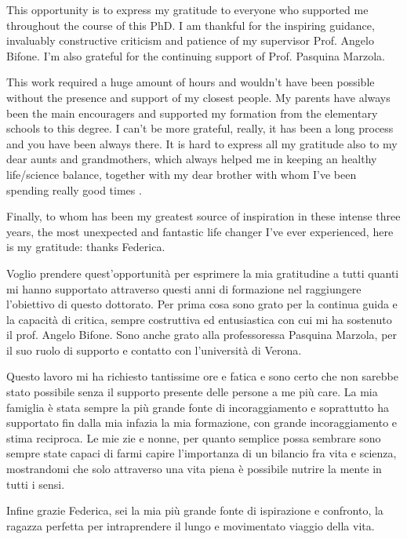 This opportunity is to express my gratitude to everyone who supported me throughout the course of this PhD.
I am thankful for the inspiring guidance, invaluably constructive criticism and patience of my supervisor Prof. Angelo Bifone.
I'm also grateful for the continuing support of Prof. Pasquina Marzola.

This work required a huge amount of hours and wouldn't have been possible without the presence and support of my closest people.
My parents have always been the main encouragers and supported my formation from the elementary schools to this degree. I can't be more grateful, really, it has been a long process and you have been always there.
It is hard to express all my gratitude also to my dear aunts and grandmothers, which always helped me in keeping an healthy life/science balance, together with my dear brother with whom I've been spending really good times .

Finally, to whom has been my greatest source of inspiration in these intense three years, the most unexpected and fantastic life changer I've ever experienced, here is my gratitude: thanks Federica.


Voglio prendere quest'opportunità per esprimere la mia gratitudine a tutti quanti mi hanno supportato attraverso questi anni di formazione nel raggiungere l'obiettivo di questo dottorato.
Per prima cosa sono grato per la continua guida e la capacità di critica, sempre costruttiva ed entusiastica con cui mi ha sostenuto il prof. Angelo Bifone.
Sono anche grato alla professoressa Pasquina Marzola, per il suo ruolo di supporto e contatto con l'università di Verona.

Questo lavoro mi ha richiesto tantissime ore e fatica e sono certo che non sarebbe stato possibile senza il supporto presente delle persone a me più care. La mia famiglia è stata sempre la più grande fonte di incoraggiamento e soprattutto ha supportato fin dalla mia infazia la mia formazione, con grande incoraggiamento e stima reciproca.
Le mie zie e nonne, per quanto semplice possa sembrare sono sempre state capaci di farmi capire l'importanza di un bilancio fra vita e scienza, mostrandomi che solo attraverso una vita piena è possibile nutrire la mente in tutti i sensi.

Infine grazie Federica, sei la mia più grande fonte di ispirazione e confronto, la ragazza perfetta per intraprendere il lungo e movimentato viaggio della vita.

